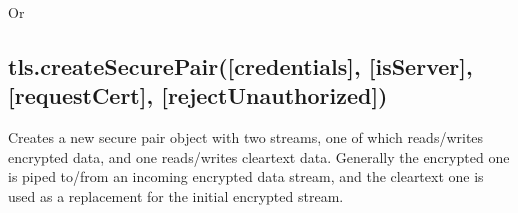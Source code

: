 Or

\begin{Shaded}
\begin{Highlighting}[]
 \NormalTok{);}
 \NormalTok{);}

 
  \NormalTok{: }\NormalTok{(}\NormalTok{)}
\NormalTok{\};}

 \NormalTok{(}\NormalTok{() \{}
  \NormalTok{(}\NormalTok{,}
                \NormalTok{: }\NormalTok{);}
  \NormalTok{();}
\NormalTok{\});}
\NormalTok{(}\NormalTok{);}
\NormalTok{(}\NormalTok{, }
\NormalTok{\});}
\NormalTok{(}\NormalTok{, }\NormalTok{() \{}
  \NormalTok{();}
\NormalTok{\});}
\end{Highlighting}
\end{Shaded}

\subsection{tls.createSecurePair({[}credentials{]}, {[}isServer{]},
{[}requestCert{]}, {[}rejectUnauthorized{]})}

Creates a new secure pair object with two streams, one of which
reads/writes encrypted data, and one reads/writes cleartext data.
Generally the encrypted one is piped to/from an incoming encrypted data
stream, and the cleartext one is used as a replacement for the initial
encrypted stream.

